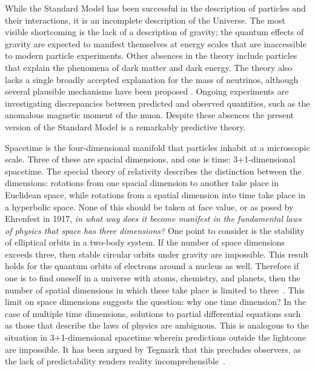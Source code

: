 While the Standard Model has been successful in the description of particles and their interactions, it is an incomplete description of the Universe.
The most visible shortcoming is the lack of a description of gravity; the quantum effects of gravity are expected to manifest themselves at energy scales that are inaccessible to modern particle experiments.
Other absences in the theory include particles that explain the phenomena of dark matter and dark energy.
The theory also lacks a single broadly accepted explanation for the mass of neutrinos, although several plausible mechanisms have been proposed \cite{jw2019}.
Ongoing experiments are investigating discrepancies between predicted and observed quantities, such as the anomalous magnetic moment of the muon.
Despite these absences the present version of the Standard Model is a remarkably predictive theory.


Spacetime is the four-dimensional manifold that particles inhabit at a microscopic scale.
Three of these are spacial dimensions, and one is time: 3+1-dimensional spacetime.
The special theory of relativity describes the distinction between the dimensions: rotations from one spacial dimension to another take place in Euclidean space, while rotations from a spatial dimension into time take place in a hyperbolic space.
None of this should be taken at face value, or as posed by Ehrenfest in 1917, \emph{in what way does it become manifest in the fundamental laws of physics that space has three dimensions?}
One point to consider is the stability of elliptical orbits in a two-body system.
If the number of space dimensions exceeds three, then stable circular orbits under gravity are impossible.
This result holds for the quantum orbits of electrons around a nucleus as well.
Therefore if one is to find oneself in a universe with atoms, chemistry, and planets, then the number of spatial dimensions in which these take place is limited to three~\cite{ehrenfest}.
This limit on space dimensions suggests the question: why one time dimension?
In the case of multiple time dimensions, solutions to partial differential equations such as those that describe the laws of physics are ambiguous.
This is analogous to the situation in 3+1-dimensional spacetime wherein predictions outside the lightcone are impossible.
It has been argued by Tegmark that this precludes observers, as the lack of predictability renders reality incomprehensible~\cite{tegmark-time}.



